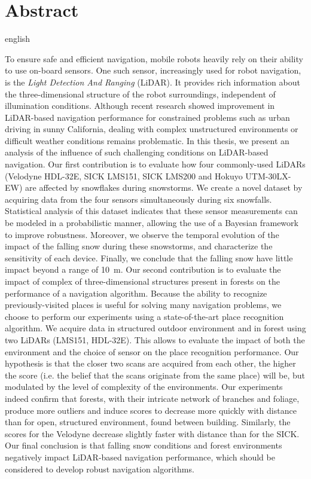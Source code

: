 \chapter*{Abstract}  

\begin{otherlanguage*}{english}

    To ensure safe and efficient navigation, mobile robots heavily rely on their ability to use on-board sensors. One such sensor, increasingly used for robot navigation, is the \emph{Light Detection And Ranging} (LiDAR). It provides rich information about the three-dimensional structure of the robot surroundings, independent of illumination conditions. Although recent research showed improvement in LiDAR-based navigation performance for constrained problems such as urban driving in sunny California, dealing with complex unstructured environments or difficult weather conditions remains problematic. In this thesis, we present an analysis of the influence of such challenging conditions on LiDAR-based navigation. Our first contribution is to evaluate how four commonly-used LiDARs (Velodyne HDL-32E, SICK LMS151, SICK LMS200 and Hokuyo UTM-30LX-EW) are affected by snowflakes during snowstorms. We create a novel dataset by acquiring data from the four sensors simultaneously during six snowfalls. Statistical analysis of this dataset indicates that these sensor measurements can be modeled in a probabilistic manner, allowing the use of a Bayesian framework to improve robustness. Moreover, we observe the temporal evolution of the impact of the falling snow during these snowstorms, and characterize the sensitivity of each device. Finally, we conclude that the falling snow have little impact beyond a range of \SI{10}{\meter}. Our second contribution is to evaluate the impact of complex of three-dimensional structures present in forests on the performance of a navigation algorithm. Because the ability to recognize previously-visited places is useful for solving many navigation problems, we choose to perform our experiments using a state-of-the-art place recognition algorithm. We acquire data in structured outdoor environment and in forest using two LiDARs (LMS151, HDL-32E). This allows to evaluate the impact of both the environment and the choice of sensor on the place recognition performance. Our hypothesis is that the closer two scans are acquired from each other, the higher the score (i.e. the belief that the scans originate from the same place) will be, but modulated by the level of complexity of the environments. Our experiments indeed confirm that forests, with their intricate network of branches and foliage, produce more outliers and induce scores to decrease more quickly with distance than for open, structured environment, found between building. Similarly, the scores for the Velodyne decrease slightly faster with distance than for the SICK. Our final conclusion is that falling snow conditions and forest environments negatively impact LiDAR-based navigation performance, which should be considered to develop robust navigation algorithms.

\end{otherlanguage*} 
